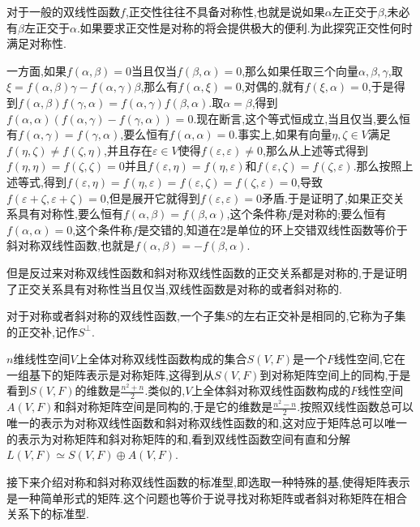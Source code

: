 对于一般的双线性函数$f$,正交性往往不具备对称性,也就是说如果$\alpha$左正交于$\beta$,未必有$\beta$左正交于$\alpha$.如果要求正交性是对称的将会提供极大的便利.为此探究正交性何时满足对称性.

一方面,如果$f(\alpha,\beta)=0$当且仅当$f(\beta,\alpha)=0$,那么如果任取三个向量$\alpha,\beta,\gamma$,取$\xi=f(\alpha,\beta)\gamma-f(\alpha,\gamma)\beta$,那么有$f(\alpha,\xi)=0$,对偶的,就有$f(\xi,\alpha)=0$,于是得到$f(\alpha,\beta)f(\gamma,\alpha)=f(\alpha,\gamma)f(\beta,\alpha)$.取$\alpha=\beta$,得到$f(\alpha,\alpha)(f(\alpha,\gamma)-f(\gamma,\alpha))=0$.现在断言,这个等式恒成立,当且仅当,要么恒有$f(\alpha,\gamma)=f(\gamma,\alpha)$,要么恒有$f(\alpha,\alpha)=0$.事实上,如果有向量$\eta,\zeta\in V$满足$f(\eta,\zeta)\not=f(\zeta,\eta)$,并且存在$\varepsilon\in V$使得$f(\varepsilon,\varepsilon)\not=0$,那么从上述等式得到$f(\eta,\eta)=f(\zeta,\zeta)=0$并且$f(\varepsilon,\eta)=f(\eta,\varepsilon)$和$f(\varepsilon,\zeta)=f(\zeta,\varepsilon)$.那么按照上述等式,得到$f(\varepsilon,\eta)=f(\eta,\varepsilon)=f(\varepsilon,\zeta)=f(\zeta,\varepsilon)=0$,导致$f(\varepsilon+\zeta,\varepsilon+\zeta)=0$,但是展开它就得到$f(\varepsilon,\varepsilon)=0$矛盾.于是证明了,如果正交关系具有对称性,要么恒有$f(\alpha,\beta)=f(\beta,\alpha)$,这个条件称$f$是对称的;要么恒有$f(\alpha,\alpha)=0$,这个条件称$f$是交错的,知道在2是单位的环上交错双线性函数等价于斜对称双线性函数,也就是$f(\alpha,\beta)=-f(\beta,\alpha)$.

但是反过来对称双线性函数和斜对称双线性函数的正交关系都是对称的,于是证明了正交关系具有对称性当且仅当,双线性函数是对称的或者斜对称的.

对于对称或者斜对称的双线性函数,一个子集$S$的左右正交补是相同的,它称为子集的正交补,记作$S^{\perp}$.

$n$维线性空间$V$上全体对称双线性函数构成的集合$S(V,F)$是一个$F$线性空间,它在一组基下的矩阵表示是对称矩阵,这得到从$S(V,F)$到对称矩阵空间上的同构,于是看到$S(V,F)$的维数是$\frac{n^2+n}{2}$.类似的,$V$上全体斜对称双线性函数构成的$F$线性空间$A(V,F)$和斜对称矩阵空间是同构的,于是它的维数是$\frac{n^2-n}{2}$.按照双线性函数总可以唯一的表示为对称双线性函数和斜对称双线性函数的和,这对应于矩阵总可以唯一的表示为对称矩阵和斜对称矩阵的和,看到双线性函数空间有直和分解$L(V,F)\simeq S(V,F)\oplus A(V,F)$.

接下来介绍对称和斜对称双线性函数的标准型,即选取一种特殊的基,使得矩阵表示是一种简单形式的矩阵.这个问题也等价于说寻找对称矩阵或者斜对称矩阵在相合关系下的标准型.

